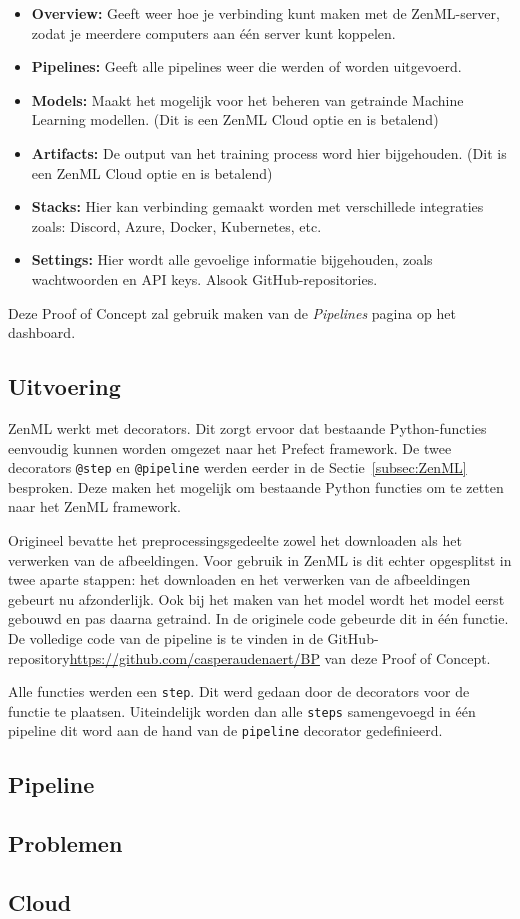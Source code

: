 \begin{itemize}
    \item \textbf{Overview:} Geeft weer hoe je verbinding kunt maken met de ZenML-server, zodat je meerdere computers aan één server kunt koppelen.
    \item \textbf{Pipelines:} Geeft alle pipelines weer die werden of worden uitgevoerd.
    \item \textbf{Models:} Maakt het mogelijk voor het beheren van getrainde Machine Learning modellen. (Dit is een ZenML Cloud optie en is betalend)
    \item \textbf{Artifacts:} De output van het training process word hier bijgehouden. (Dit is een ZenML Cloud optie en is betalend)
    \item \textbf{Stacks:} Hier kan verbinding gemaakt worden met verschillede integraties zoals: Discord, Azure, Docker, Kubernetes, etc.
    \item \textbf{Settings:} Hier wordt alle gevoelige informatie bijgehouden, zoals wachtwoorden en API keys. Alsook GitHub-repositories.
\end{itemize}
Deze Proof of Concept zal gebruik maken van de \textit{Pipelines} pagina op het dashboard.

\subsection{Uitvoering}
ZenML werkt met decorators. Dit zorgt ervoor dat bestaande Python-functies eenvoudig kunnen worden omgezet naar het Prefect framework. De twee decorators \texttt{@step} en \texttt{@pipeline} werden eerder in de Sectie~\ref{subsec:ZenML} besproken. Deze maken het mogelijk om bestaande Python functies om te zetten naar het ZenML framework.

Origineel bevatte het preprocessingsgedeelte zowel het downloaden als het verwerken van de afbeeldingen. Voor gebruik in ZenML is dit echter opgesplitst in twee aparte stappen: het downloaden en het verwerken van de afbeeldingen gebeurt nu afzonderlijk. Ook bij het maken van het model wordt het model eerst gebouwd en pas daarna getraind. In de originele code gebeurde dit in één functie.
De volledige code van de pipeline is te vinden in de GitHub-repository{\url{https://github.com/casperaudenaert/BP}} van deze Proof of Concept. %

Alle functies werden een \texttt{step}. Dit werd gedaan door de decorators voor de functie te plaatsen. Uiteindelijk worden dan alle \texttt{steps} samengevoegd in één pipeline dit word aan de hand van de \texttt{pipeline} decorator gedefinieerd.
\subsection{Pipeline}

\subsection{Problemen}
\subsection{Cloud}
